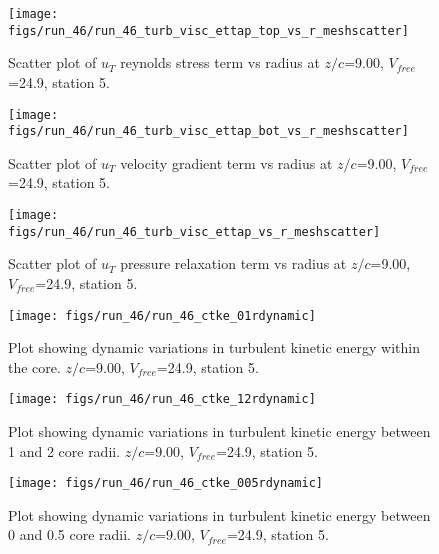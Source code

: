 \begin{figure}[H]
\centering
\texttt{[image: figs/run\_46/run\_46\_turb\_visc\_ettap\_top\_vs\_r\_meshscatter]}
\caption{Scatter plot of $
u_T$ reynolds stress term vs radius at $z/c$=9.00, $V_{free}$=24.9, station 5.}
\label{fig:run_46_turb_visc_ettap_top_vs_r_meshscatter}
\end{figure}


\begin{figure}[H]
\centering
\texttt{[image: figs/run\_46/run\_46\_turb\_visc\_ettap\_bot\_vs\_r\_meshscatter]}
\caption{Scatter plot of $
u_T$ velocity gradient term vs radius at $z/c$=9.00, $V_{free}$=24.9, station 5.}
\label{fig:run_46_turb_visc_ettap_bot_vs_r_meshscatter}
\end{figure}


\begin{figure}[H]
\centering
\texttt{[image: figs/run\_46/run\_46\_turb\_visc\_ettap\_vs\_r\_meshscatter]}
\caption{Scatter plot of $
u_T$ pressure relaxation term vs radius at $z/c$=9.00, $V_{free}$=24.9, station 5.}
\label{fig:run_46_turb_visc_ettap_vs_r_meshscatter}
\end{figure}


\begin{figure}[H]
\centering
\texttt{[image: figs/run\_46/run\_46\_ctke\_01rdynamic]}
\caption{Plot showing dynamic variations in turbulent kinetic energy within the core. $z/c$=9.00, $V_{free}$=24.9, station 5.}
\label{fig:run_46_ctke_01rdynamic}
\end{figure}


\begin{figure}[H]
\centering
\texttt{[image: figs/run\_46/run\_46\_ctke\_12rdynamic]}
\caption{Plot showing dynamic variations in turbulent kinetic energy between 1 and 2 core radii. $z/c$=9.00, $V_{free}$=24.9, station 5.}
\label{fig:run_46_ctke_12rdynamic}
\end{figure}


\begin{figure}[H]
\centering
\texttt{[image: figs/run\_46/run\_46\_ctke\_005rdynamic]}
\caption{Plot showing dynamic variations in turbulent kinetic energy between 0 and 0.5 core radii. $z/c$=9.00, $V_{free}$=24.9, station 5.}
\label{fig:run_46_ctke_005rdynamic}
\end{figure}



